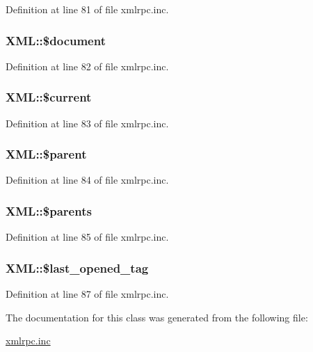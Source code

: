 Definition at line 81 of file xmlrpc.inc.\hypertarget{classXML_01d565098eeda8bf09e4242a2748d570}{
\subsubsection{\setlength{\rightskip}{0pt plus 5cm}XML::\$document}}
\label{classXML_01d565098eeda8bf09e4242a2748d570}




Definition at line 82 of file xmlrpc.inc.\hypertarget{classXML_7c20d75c1719294f3320a537a32753ca}{
\subsubsection{\setlength{\rightskip}{0pt plus 5cm}XML::\$current}}
\label{classXML_7c20d75c1719294f3320a537a32753ca}




Definition at line 83 of file xmlrpc.inc.\hypertarget{classXML_fa51193c2f0b317f817fa3efa8722227}{
\subsubsection{\setlength{\rightskip}{0pt plus 5cm}XML::\$parent}}
\label{classXML_fa51193c2f0b317f817fa3efa8722227}




Definition at line 84 of file xmlrpc.inc.\hypertarget{classXML_c10be009a77c59e80ce5562d4dd35532}{
\subsubsection{\setlength{\rightskip}{0pt plus 5cm}XML::\$parents}}
\label{classXML_c10be009a77c59e80ce5562d4dd35532}




Definition at line 85 of file xmlrpc.inc.\hypertarget{classXML_60e7e74df6643f50e0c6ea8252554b3d}{
\subsubsection{\setlength{\rightskip}{0pt plus 5cm}XML::\$last\_\-opened\_\-tag}}
\label{classXML_60e7e74df6643f50e0c6ea8252554b3d}




Definition at line 87 of file xmlrpc.inc.

The documentation for this class was generated from the following file:\begin{CompactItemize}
\item 
\hyperlink{xmlrpc_8inc}{xmlrpc.inc}\end{CompactItemize}
